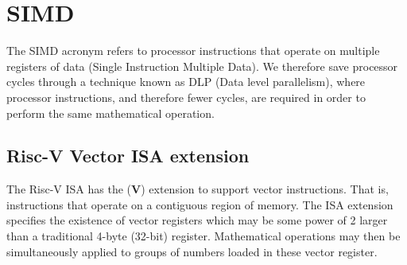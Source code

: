 \documentclass[a4paper,8pt]{report}
\begin{document}











\section{SIMD}
The SIMD acronym refers to processor instructions that operate on multiple
registers of data (Single Instruction Multiple Data). We therefore save
processor cycles through a technique known as DLP (Data level parallelism),
where processor instructions, and therefore fewer cycles, are required in order
to perform the same mathematical operation.

\subsection{Risc-V Vector ISA extension}
The Risc-V ISA has the (\textbf{V}) extension to support vector instructions.
That is, instructions that operate on a contiguous region of memory. The ISA
extension specifies the existence of vector registers which may be some power of
2 larger than a traditional 4-byte (32-bit) register. Mathematical operations
may then be simultaneously applied to groups of numbers loaded in these vector
register.
\end{document}
